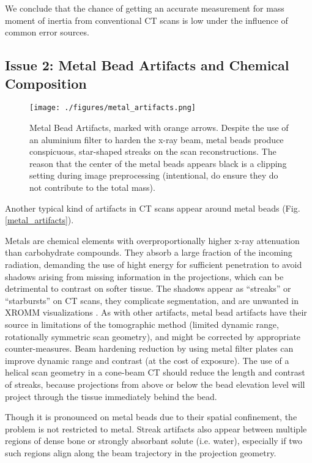 We conclude that the chance of getting an accurate measurement for mass moment of inertia from conventional CT scans is low under the influence of common error sources.



\subsection{Issue 2: Metal Bead Artifacts and Chemical Composition}
\label{sec:org9f0931f}

\begin{figure}[htbp]
\centering
\texttt{[image: ./figures/metal\_artifacts.png]}
\caption{\label{fig:metal_artifacts}Metal Bead Artifacts, marked with orange arrows. Despite the use of an aluminium filter to harden the x-ray beam, metal beads produce conspicuous, star-shaped streaks on the scan reconstructions. The reason that the center of the metal beads appears black is a clipping setting during image preprocessing (intentional, do ensure they do not contribute to the total mass).}
\end{figure}

Another typical kind of artifacts in CT scans appear around metal beads (Fig. \ref{metal_artifacts}).

Metals are chemical elements with overproportionally higher x-ray attenuation than carbohydrate compounds.
They absorb a large fraction of the incoming radiation, demanding the use of hight energy for sufficient penetration to avoid shadows arising from missing information in the projections, which can be detrimental to contrast on softer tissue.
The shadows appear as ``streaks'' or ``starbursts'' on CT scans, they complicate segmentation, and are unwanted in XROMM visualizations \citep{Brainerd2010}.
As with other artifacts, metal bead artifacts have their source in limitations of the tomographic method (limited dynamic range, rotationally symmetric scan geometry), and might be corrected by appropriate counter-measures.
Beam hardening reduction by using metal filter plates can improve dynamic range and contrast (at the cost of exposure).
The use of a helical scan geometry in a cone-beam CT should reduce the length and contrast of streaks, because projections from above or below the bead elevation level will project through the tissue immediately behind the bead.

Though it is pronounced on metal beads due to their spatial confinement, the problem is not restricted to metal.
Streak artifacts also appear between multiple regions of dense bone or strongly absorbant solute (i.e. water), especially if two such regions align along the beam trajectory in the projection geometry.


